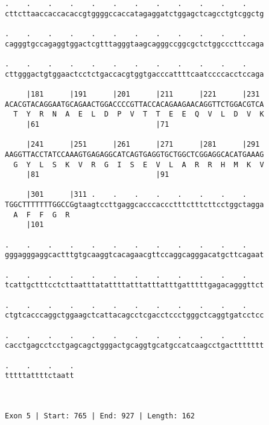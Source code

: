 \documentclass{article}
\begin{document}
\begin{Verbatim}
.    .    .    .    .    .    .    .    .    .    .    .    
cttcttaaccaccacaccgtggggccaccatagaggatctggagctcagcctgtcggctg
                                                            
.    .    .    .    .    .    .    .    .    .    .    .    
cagggtgccagaggtggactcgtttagggtaagcagggccggcgctctggcccttccaga
                                                            
.    .    .    .    .    .    .    .    .    .    .    .    
cttgggactgtggaactcctctgaccacgtggtgacccattttcaatccccacctccaga
                                                            
     |181      |191      |201      |211      |221      |231 
ACACGTACAGGAATGCAGAACTGGACCCCGTTACCACAGAAGAACAGGTTCTGGACGTCA
  T  Y  R  N  A  E  L  D  P  V  T  T  E  E  Q  V  L  D  V  K
     |61                           |71                      
  
     |241      |251      |261      |271      |281      |291 
AAGGTTACCTATCCAAAGTGAGAGGCATCAGTGAGGTGCTGGCTCGGAGGCACATGAAAG
  G  Y  L  S  K  V  R  G  I  S  E  V  L  A  R  R  H  M  K  V
     |81                           |91                      
  
     |301      |311 .    .    .    .    .    .    .    .    
TGGCTTTTTTTGGCCGgtaagtccttgaggcacccaccctttctttcttcctggctagga
  A  F  F  G  R                                             
     |101                                                   
  
.    .    .    .    .    .    .    .    .    .    .    .    
gggagggaggcactttgtgcaaggtcacagaacgttccaggcagggacatgcttcagaat
                                                            
.    .    .    .    .    .    .    .    .    .    .    .    
tcattgctttcctcttaatttatattttatttatttatttgatttttgagacagggttct
                                                            
.    .    .    .    .    .    .    .    .    .    .    .    
ctgtcacccaggctggaagctcattacagcctcgacctccctgggctcaggtgatcctcc
                                                            
.    .    .    .    .    .    .    .    .    .    .    .    
cacctgagcctcctgagcagctgggactgcaggtgcatgccatcaagcctgacttttttt
                                                            
.    .    .    .
tttttattttctaatt
                
                
 
Exon 5 | Start: 765 | End: 927 | Length: 162




\end{Verbatim}
\end{document}
